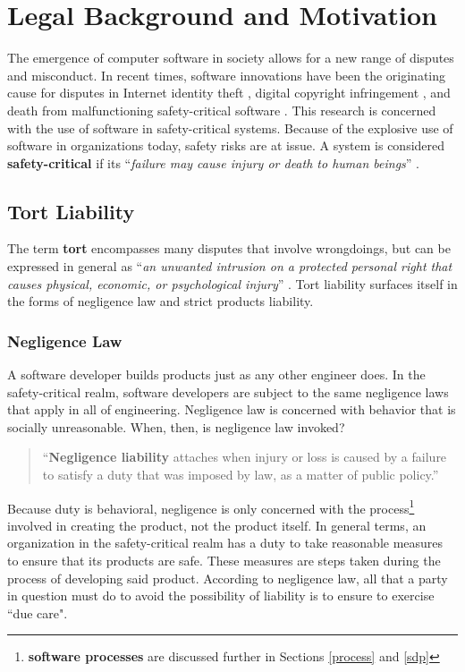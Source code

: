 \section{Legal Background and Motivation}\label{legal}
The emergence of computer software in society allows for a new range of disputes
and misconduct. In recent times, software innovations have been the originating
cause for disputes in Internet identity theft \cite{Valetk2004}, digital 
copyright infringement \cite{Manesh2006}, and death from malfunctioning 
safety-critical software \cite{Leveson1993}. This research is concerned with the
use of software in safety-critical systems. Because of the explosive use of
software in organizations today, safety risks are at issue. A system is 
considered \textbf{safety-critical} if its ``\textit{failure may cause injury or
death to human beings}'' \cite{FOLDOC}.

\subsection{Tort Liability}
The term \textbf{tort} encompasses many disputes that involve wrongdoings, but 
can be expressed in general as ``\textit{an unwanted intrusion on a protected
personal right that causes physical, economic, or psychological injury}'' 
\cite{Burgunder2004}. Tort liability surfaces itself in the forms of negligence
law and strict products liability.

\subsubsection{Negligence Law}
A software developer builds products just as any other engineer does. In the
safety-critical realm, software developers are subject to the same negligence
laws that apply in all of engineering. Negligence law is concerned with behavior
that is socially unreasonable. When, then, is negligence law invoked?

\begin{quote}
``\textbf{Negligence liability} attaches when injury or loss is caused by a 
failure to satisfy a duty that was imposed by law, as a matter of public
policy.'' \cite{Kaner_neg_1995}
\end{quote}

Because duty is behavioral, negligence is only concerned with the
process\footnote{\textbf{software processes} are discussed further in
Sections \ref{process} and \ref{sdp}} involved in creating the product, not the
product itself. In general terms, an organization in the safety-critical realm
has a duty to take reasonable measures to ensure that its products are safe.
These measures are steps taken during the process of developing said product. 
According to negligence law, all that a party in question must do to avoid the 
possibility of liability is to ensure to exercise ``due care".

